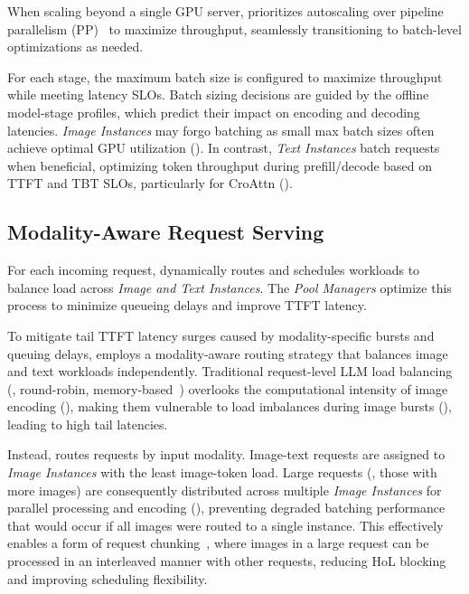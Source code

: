 When scaling beyond a single GPU server, \sysname{} prioritizes autoscaling over pipeline parallelism (PP)~\cite{shazeer2020megatron} to maximize throughput, seamlessly transitioning to batch-level optimizations as needed.

For each stage, the maximum batch size is configured to maximize throughput while meeting latency SLOs.
Batch sizing decisions are guided by the offline model-stage profiles, which predict their impact on encoding and decoding latencies.
\emph{Image Instances} may forgo batching as small max batch sizes often achieve optimal GPU utilization ().
In contrast, \emph{Text Instances} batch requests when beneficial, optimizing token throughput during prefill/decode based on TTFT and TBT SLOs, particularly for CroAttn \lmms{} ().

\subsection{Modality-Aware \lmm{} Request Serving}
\label{sec:design:modality-aware-serving}
For each incoming \lmm{} request, \sysname{} dynamically routes and schedules workloads to balance load across \emph{Image and Text Instances}.
The \emph{Pool Managers} optimize this process to minimize queueing delays and improve TTFT latency.

To mitigate tail TTFT latency surges caused by modality-specific bursts and queuing delays, \sysname{} employs a modality-aware routing strategy that balances image and text workloads independently.
Traditional request-level LLM load balancing (\eg{}, round-robin, memory-based~\cite{sun2024llumnix}) overlooks the computational intensity of image encoding (), making them vulnerable to load imbalances during image bursts (), leading to high tail latencies.

Instead, \sysname{} routes requests by input modality.
Image-text requests are assigned to \emph{Image Instances} with the least image-token load.
Large requests (\ie{}, those with more images) are consequently distributed across multiple \emph{Image Instances} for parallel processing and encoding (), preventing degraded batching performance that would occur if all images were routed to a single instance.
This effectively enables a form of request chunking~\cite{sarathi-serve}, where images in a large request can be processed in an interleaved manner with other requests, reducing HoL blocking and improving scheduling flexibility.

